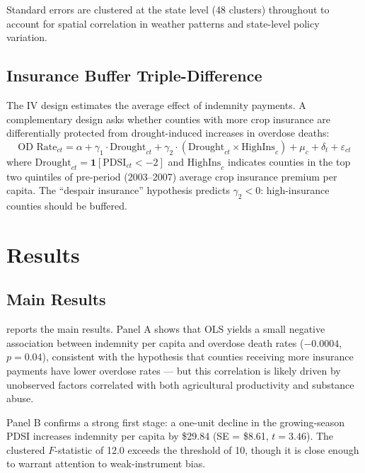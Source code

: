 \documentclass[12pt]{article}
\begin{document}
Standard errors are clustered at the state level (48 clusters) throughout to account for spatial correlation in weather patterns and state-level policy variation.

\subsection{Insurance Buffer Triple-Difference}

The IV design estimates the average effect of indemnity payments. A complementary design asks whether counties with more crop insurance are differentially protected from drought-induced increases in overdose deaths:
\begin{equation}
\text{OD Rate}_{ct} = \alpha + \gamma_1 \cdot \text{Drought}_{ct} + \gamma_2 \cdot (\text{Drought}_{ct} \times \text{HighIns}_c) + \mu_c + \delta_t + \varepsilon_{ct}
\label{eq:triplediff}
\end{equation}
where $\text{Drought}_{ct} = \mathbf{1}[\text{PDSI}_{ct} < -2]$ and $\text{HighIns}_c$ indicates counties in the top two quintiles of pre-period (2003--2007) average crop insurance premium per capita. The ``despair insurance'' hypothesis predicts $\gamma_2 < 0$: high-insurance counties should be buffered.

\section{Results}

\subsection{Main Results}



 reports the main results. Panel A shows that OLS yields a small negative association between indemnity per capita and overdose death rates ($-0.0004$, $p = 0.04$), consistent with the hypothesis that counties receiving more insurance payments have lower overdose rates --- but this correlation is likely driven by unobserved factors correlated with both agricultural productivity and substance abuse.

Panel B confirms a strong first stage: a one-unit decline in the growing-season PDSI increases indemnity per capita by \$29.84 (SE = \$8.61, $t = 3.46$). The clustered $F$-statistic of 12.0 exceeds the \citet{stockyogo2005} threshold of 10, though it is close enough to warrant attention to weak-instrument bias.
\end{document}
